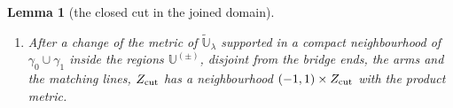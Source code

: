 \documentclass[11pt]{amsart}
\newtheorem{lemma}[theorem]{Lemma}
\theoremstyle{definition}
\theoremstyle{remark}
\theoremstyle{plain}
\numberwithin{equation}{section}
\begin{document}
\begin{lemma}[the closed cut in the joined domain]
\begin{enumerate}[label=(\roman*)]
  $\varrho_\lambda(\eta'^{(+)}_-)\times T$. Then $d_1=d_2$, $d_3=d_4$ and $\Phi_J=\langle d_1,d_3\rangle$.
  Restricted to $\mathrm{(II)}$, $\Phi_J$ is the subgroup $\phi_{\overline W}$ of
  \cite[Section~5.3]{KM-unknot} generated by the duals of the four copies of an
  interval times $T$ over the dotted edges of $U$, and its image at the ends is
  $\Phi_{\overline{\mathsf E}}=\{(s,s_-,s_+):s=s_-+s_+\}$. Restricted to $\mathrm{(I)}$, $\Phi_J$ is the
  lifting group of the domain of the pair $(A_0,A_1)$, generated by the class that
  restricts to $s_Z$ on $Z$; and $\Phi_J$ is the fibre product of the two restrictions
  over $\phi_Z=\langle s_Z\rangle$.
\item After a change of the metric of $\widetilde{\mathbb U}_\lambda$ supported in a compact
  neighbourhood of $\gamma_0\cup\gamma_1$ inside the regions $\mathbb U^{(\pm)}$, disjoint from the bridge
  ends, the arms and the matching lines, $Z_{\rm cut}$ has a neighbourhood
  $(-1,1)\times Z_{\rm cut}$ with the product metric.
\end{enumerate}
\end{lemma}
\end{document}
